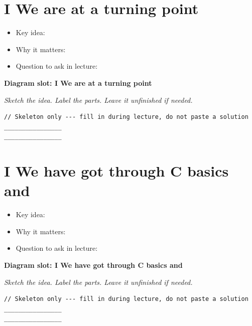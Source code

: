 \documentclass[12pt]{article}
\begin{document}
\section{I We are at a turning point}
\begin{itemize}[leftmargin=*]
  \item Key idea: \hrulefill
  \vspace{1.1em}
  \item Why it matters: \hrulefill
  \vspace{1.1em}
  \item Question to ask in lecture: \hrulefill
\end{itemize}
\noindent\textbf{Diagram slot: I We are at a turning point}
\begin{framed}
\begin{minipage}[t][0.22\textheight]{\textwidth}
\vspace{0.4em}
\textit{Sketch the idea. Label the parts. Leave it unfinished if needed.}
\end{minipage}
\end{framed}
\vspace{1em}
\begin{lstlisting}
// Skeleton only --- fill in during lecture, do not paste a solution
________________
________________
\end{lstlisting}
\vspace{1em}
\section{I We have got through C basics and}
\begin{itemize}[leftmargin=*]
  \item Key idea: \hrulefill
  \vspace{1.1em}
  \item Why it matters: \hrulefill
  \vspace{1.1em}
  \item Question to ask in lecture: \hrulefill
\end{itemize}
\noindent\textbf{Diagram slot: I We have got through C basics and}
\begin{framed}
\begin{minipage}[t][0.22\textheight]{\textwidth}
\vspace{0.4em}
\textit{Sketch the idea. Label the parts. Leave it unfinished if needed.}
\end{minipage}
\end{framed}
\vspace{1em}
\begin{lstlisting}
// Skeleton only --- fill in during lecture, do not paste a solution
________________
________________
\end{lstlisting}
\vspace{1em}
\end{document}
